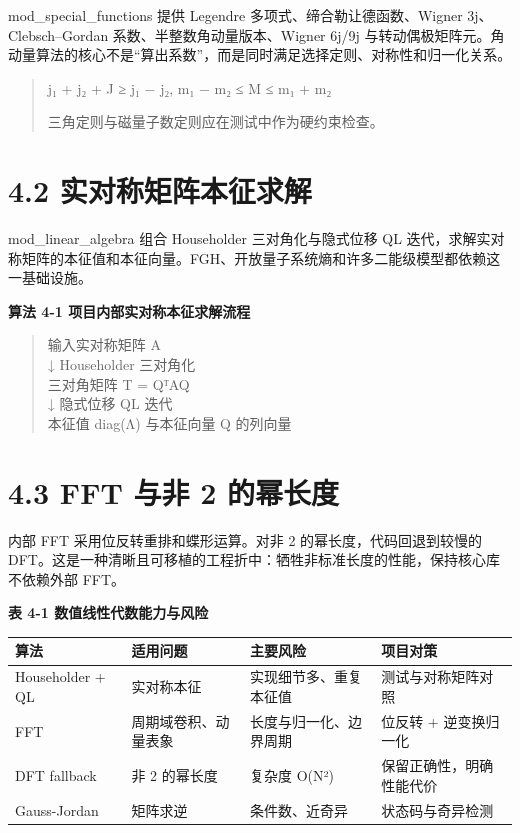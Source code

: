 \documentclass[UTF8,openany,11pt,fontset=fandol]{ctexbook}
\begin{document}
mod\_special\_functions 提供 Legendre 多项式、缔合勒让德函数、Wigner
3j、Clebsch--Gordan 系数、半整数角动量版本、Wigner 6j/9j
与转动偶极矩阵元。角动量算法的核心不是``算出系数''，而是同时满足选择定则、对称性和归一化关系。

\begin{quote}
j₁ + j₂ + J ≥ \textbar j₁ − j₂\textbar, \textbar m₁ − m₂\textbar{} ≤ M ≤
\textbar m₁ + m₂\textbar{}

三角定则与磁量子数定则应在测试中作为硬约束检查。
\end{quote}

\section{\texorpdfstring{\textbf{4.2
实对称矩阵本征求解}}{4.2 实对称矩阵本征求解}}\label{ux5b9eux5bf9ux79f0ux77e9ux9635ux672cux5f81ux6c42ux89e3}

mod\_linear\_algebra 组合 Householder 三对角化与隐式位移 QL
迭代，求解实对称矩阵的本征值和本征向量。FGH、开放量子系统熵和许多二能级模型都依赖这一基础设施。

\textbf{算法 4-1 项目内部实对称本征求解流程}

\begin{quote}
输入实对称矩阵 A\\
↓ Householder 三对角化\\
三对角矩阵 T = QᵀAQ\\
↓ 隐式位移 QL 迭代\\
本征值 diag(Λ) 与本征向量 Q 的列向量
\end{quote}

\section{\texorpdfstring{\textbf{4.3 FFT 与非 2
的幂长度}}{4.3 FFT 与非 2 的幂长度}}\label{fft-ux4e0eux975e-2-ux7684ux5e42ux957fux5ea6}

内部 FFT 采用位反转重排和蝶形运算。对非 2 的幂长度，代码回退到较慢的
DFT。这是一种清晰且可移植的工程折中：牺牲非标准长度的性能，保持核心库不依赖外部
FFT。

\textbf{表 4-1 数值线性代数能力与风险}

\begin{longtable}[]{@{}llll@{}}
\toprule
\textbf{算法} & \textbf{适用问题} & \textbf{主要风险} &
\textbf{项目对策}\tabularnewline
\midrule
\endhead
Householder + QL & 实对称本征 & 实现细节多、重复本征值 &
测试与对称矩阵对照\tabularnewline
FFT & 周期域卷积、动量表象 & 长度与归一化、边界周期 & 位反转 +
逆变换归一化\tabularnewline
DFT fallback & 非 2 的幂长度 & 复杂度 O(N²) &
保留正确性，明确性能代价\tabularnewline
Gauss-Jordan & 矩阵求逆 & 条件数、近奇异 &
状态码与奇异检测\tabularnewline
\bottomrule
\end{longtable}
\end{document}
